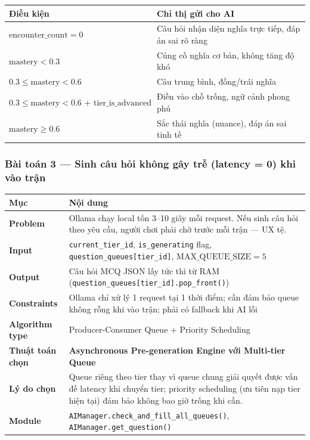 \begin{table}[h!]
\centering
\small
\begin{tabularx}{\textwidth}{|l|X|}
\toprule
\textbf{Điều kiện} & \textbf{Chỉ thị gửi cho AI} \\
\midrule
$\text{encounter\_count} = 0$ & Câu hỏi nhận diện nghĩa trực tiếp, đáp án sai rõ ràng \\
$\text{mastery} < 0.3$ & Củng cố nghĩa cơ bản, không tăng độ khó \\
$0.3 \le \text{mastery} < 0.6$ & Câu trung bình, đồng/trái nghĩa \\
$0.3 \le \text{mastery} < 0.6 \text{ + tier\_is\_advanced}$ & Điền vào chỗ trống, ngữ cảnh phong phú \\
$\text{mastery} \ge 0.6$ & Sắc thái nghĩa (nuance), đáp án sai tinh tế \\
\bottomrule
\end{tabularx}
\end{table}

\newpage

\subsubsection{Bài toán 3 — Sinh câu hỏi không gây trễ (latency = 0) khi vào trận}
\begin{tabularx}{\textwidth}{|l|X|}
\toprule
\textbf{Mục} & \textbf{Nội dung} \\
\midrule
\textbf{Problem} & Ollama chạy local tốn 3–10 giây mỗi request. Nếu sinh câu hỏi theo yêu cầu, người chơi phải chờ trước mỗi trận — UX tệ. \\
\textbf{Input} & \texttt{current\_tier\_id}, \texttt{is\_generating} flag, \texttt{question\_queues[tier\_id]}, $\text{MAX\_QUEUE\_SIZE} = 5$ \\
\textbf{Output} & Câu hỏi MCQ JSON lấy tức thì từ RAM (\texttt{question\_queues[tier\_id].pop\_front()}) \\
\textbf{Constraints} & Ollama chỉ xử lý 1 request tại 1 thời điểm; cần đảm bảo queue không rỗng khi vào trận; phải có fallback khi AI lỗi \\
\textbf{Algorithm type} & Producer-Consumer Queue + Priority Scheduling \\
\textbf{Thuật toán chọn} & \textbf{Asynchronous Pre-generation Engine với Multi-tier Queue} \\
\textbf{Lý do chọn} & Queue riêng theo tier thay vì queue chung giải quyết được vấn đề latency khi chuyển tier; priority scheduling (ưu tiên nạp tier hiện tại) đảm bảo không bao giờ trống khi cần. \\
\textbf{Module} & \texttt{AIManager.check\_and\_fill\_all\_queues()}, \texttt{AIManager.get\_question()} \\
\bottomrule
\end{tabularx}

